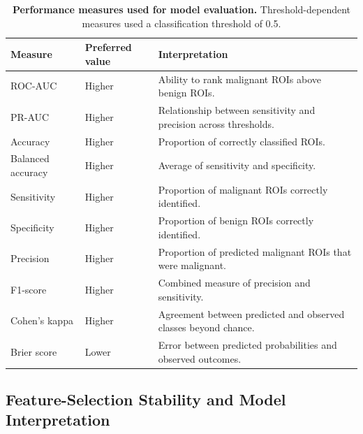 \documentclass[12pt,twocolumn]{article}
\begin{document}
\begin{table}[htbp]
\centering
\caption{\textbf{Performance measures used for model evaluation.}
Threshold-dependent measures used a classification threshold of 0.5.}
\label{tab:evaluation_metrics}
\small
\begin{tabularx}{\textwidth}{p{2.8cm} p{2.5cm} X}
\toprule
\textbf{Measure} &
\textbf{Preferred value} &
\textbf{Interpretation} \\
\midrule

ROC-AUC &
Higher &
Ability to rank malignant ROIs above benign ROIs. \\

PR-AUC &
Higher &
Relationship between sensitivity and precision across thresholds. \\

Accuracy &
Higher &
Proportion of correctly classified ROIs. \\

Balanced accuracy &
Higher &
Average of sensitivity and specificity. \\

Sensitivity &
Higher &
Proportion of malignant ROIs correctly identified. \\

Specificity &
Higher &
Proportion of benign ROIs correctly identified. \\

Precision &
Higher &
Proportion of predicted malignant ROIs that were malignant. \\

F1-score &
Higher &
Combined measure of precision and sensitivity. \\

Cohen's kappa &
Higher &
Agreement between predicted and observed classes beyond chance. \\

Brier score &
Lower &
Error between predicted probabilities and observed outcomes. \\

\bottomrule
\end{tabularx}
\end{table}










\subsection{Feature-Selection Stability and Model Interpretation}
\label{subsec:stability_interpretation}
\end{document}
